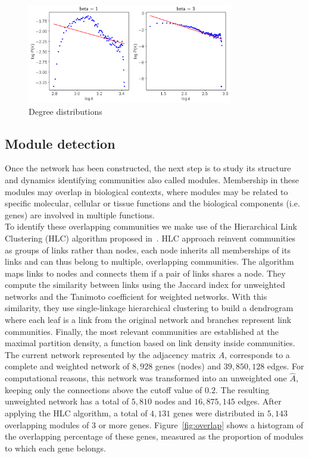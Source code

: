 \documentclass[journal, onecolumn]{IEEEtran}
\begin{document}
\begin{figure}[h]
  \centering
    \includegraphics[clip,width=0.8\textwidth]{Figures/pick_beta.png}
  \caption{Degree distributions}
  \label{fig:beta}
\end{figure}

\subsection{Module detection}	
Once the network has been constructed, the next step is to study its structure and dynamics identifying communities also called modules. Membership in these modules may overlap in biological contexts, where modules may be related to specific molecular, cellular or tissue functions and the biological components (i.e. genes) are involved in multiple functions.\\

To identify these overlapping communities we make use of the Hierarchical Link Clustering (HLC) algorithm proposed in~\cite{ahn2010link}. HLC approach reinvent communities as groups of links rather than nodes, each node inherits all memberships of its links and can thus belong to multiple, overlapping communities. The algorithm maps links to nodes and connects them if a pair of links shares a node. They compute the similarity between links using the Jaccard index for unweighted networks and the Tanimoto coefficient for weighted networks. With this similarity, they use single-linkage hierarchical clustering to build a dendrogram where each leaf is a link from the original network and branches represent link communities. Finally, the most relevant communities are established at the maximal partition density, a function  based on link density inside communities.\\

The current network represented by the adjacency matrix $A$, corresponds to a complete and weighted network of $8,928$ genes (nodes) and $39,850,128$ edges. For computational reasons, this network was transformed into an unweighted one $\hat{A}$, keeping only the connections above the cutoff value of $0.2$. The resulting unweighted network has a total of $5,810$ nodes and $16,875,145$ edges. After applying the HLC algorithm, a total of $4,131$ genes were distributed in $5,143$ overlapping modules of $3$ or more genes. Figure~\ref{fig:overlap} shows a histogram of the overlapping percentage of these genes, measured as the proportion of modules to which each gene belongs.\\
\end{document}
